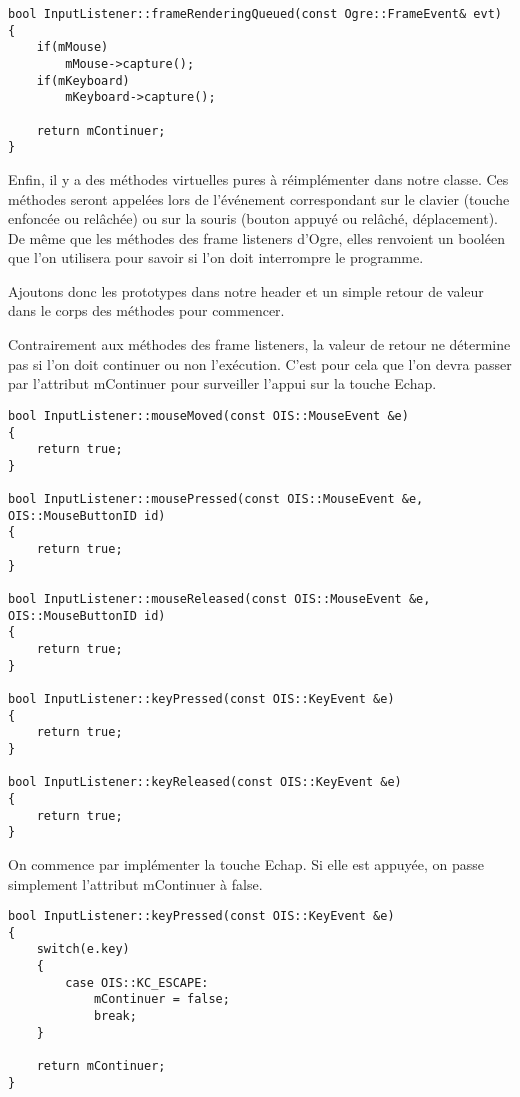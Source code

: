 \documentclass[10pt,a4paper]{report}
\begin{document}
\begin{lstlisting}[caption={}]
bool InputListener::frameRenderingQueued(const Ogre::FrameEvent& evt)
{
    if(mMouse)
        mMouse->capture();
    if(mKeyboard)
        mKeyboard->capture();

    return mContinuer;
}
\end{lstlisting}

Enfin, il y a des m\'ethodes virtuelles pures \`a r\'eimpl\'ementer dans notre classe. Ces m\'ethodes seront appel\'ees lors de l'\'ev\'enement correspondant sur le clavier (touche enfonc\'ee ou rel\^ach\'ee) ou sur la souris (bouton appuy\'e ou rel\^ach\'e, d\'eplacement). De m\^eme que les m\'ethodes des frame listeners d'Ogre, elles renvoient un bool\'een que l'on utilisera pour savoir si l'on doit interrompre le programme.

Ajoutons donc les prototypes dans notre header et un simple retour de valeur dans le corps des m\'ethodes pour commencer.

Contrairement aux m\'ethodes des frame listeners, la valeur de retour ne d\'etermine pas si l'on doit continuer ou non l'ex\'ecution. C'est pour cela que l'on devra passer par l'attribut mContinuer pour surveiller l'appui sur la touche Echap.


\begin{lstlisting}[caption={M\'ethodes virtuelles appel\'ees lors d'un \'ev\`enement sur un p\'eriph\'erique}]
bool InputListener::mouseMoved(const OIS::MouseEvent &e)
{
    return true;
}

bool InputListener::mousePressed(const OIS::MouseEvent &e, OIS::MouseButtonID id)
{
    return true;
}

bool InputListener::mouseReleased(const OIS::MouseEvent &e, OIS::MouseButtonID id)
{
    return true;
}

bool InputListener::keyPressed(const OIS::KeyEvent &e)
{
    return true;
}

bool InputListener::keyReleased(const OIS::KeyEvent &e)
{
    return true;
}
\end{lstlisting}

On commence par impl\'ementer la touche Echap. Si elle est appuy\'ee, on passe simplement l'attribut mContinuer \`a false.

\begin{lstlisting}[caption={Impl\'ementation de l'appuie sur ECHAP}]
bool InputListener::keyPressed(const OIS::KeyEvent &e)
{
    switch(e.key)
    {
        case OIS::KC_ESCAPE:
            mContinuer = false;
            break;
    }

    return mContinuer;
}
\end{lstlisting}
\end{document}

